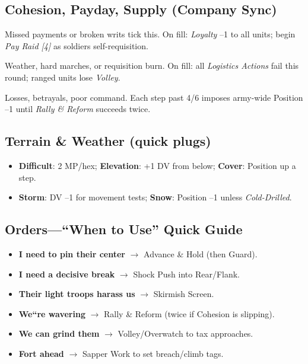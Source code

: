 \documentclass[11pt]{article}
\begin{document}
\subsection{Cohesion, Payday, Supply (Company Sync)}
\begin{description}[leftmargin=*,style=nextline]
  \item[Payday (4)] Missed payments or broken writs tick this. On fill: \emph{Loyalty} --1 to all units; begin \emph{Pay Raid [4]} as soldiers self-requisition.
  \item[Supply (4)] Weather, hard marches, or requisition burn. On fill: all \emph{Logistics Actions} fail this round; ranged units lose \emph{Volley}.
  \item[Cohesion (6)] Losses, betrayals, poor command. Each step past 4/6 imposes army-wide Position --1 until \emph{Rally \& Reform} succeeds twice.
\end{description}

\subsection{Terrain \& Weather (quick plugs)}
\begin{itemize}[leftmargin=*]
  \item \textbf{Difficult}: 2 MP/hex; \textbf{Elevation}: +1 DV from below; \textbf{Cover}: Position up a step.
  \item \textbf{Storm}: DV --1 for movement tests; \textbf{Snow}: Position --1 unless \textit{Cold-Drilled}.
\end{itemize}

\subsection{Orders---``When to Use'' Quick Guide}
\begin{itemize}[leftmargin=*]
  \item \textbf{I need to pin their center} $\rightarrow$ Advance \& Hold (then Guard).
  \item \textbf{I need a decisive break} $\rightarrow$ Shock Push into Rear/Flank.
  \item \textbf{Their light troops harass us} $\rightarrow$ Skirmish Screen.
  \item \textbf{We``re wavering} $\rightarrow$ Rally \& Reform (twice if Cohesion is slipping).
  \item \textbf{We can grind them} $\rightarrow$ Volley/Overwatch to tax approaches.
  \item \textbf{Fort ahead} $\rightarrow$ Sapper Work to set breach/climb tags.
\end{itemize}
\end{document}
